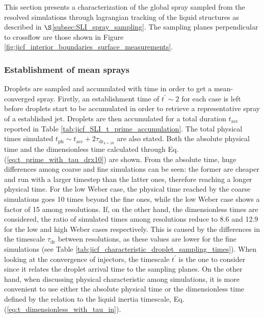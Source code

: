 
This section presents a characterization of the global spray sampled from the resolved simulations through lagrangian tracking of the liquid structures as described in $\S$\ref{subsec:SLI_spray_sampling}. The sampling planes perpendicular to crossflow are those shown in Figure \ref{fig:jicf_interior_boundaries_surface_measurements}.


\subsubsection*{Establishment of mean sprays}

Droplets are sampled and accumulated with time in order to get a mean-converged spray. Firstly, an establishment time of $t^{\prime} \sim 2$ for each case is left before droplets start to be accumulated in order to retrieve a representative spray of a established jet. Droplets are then accumulated for a total duration $t_\mathrm{acc}$ reported in Table \ref{tab:jicf_SLI_t_prime_accumulation}. The total physical times simulated $t_\mathrm{ph} \sim t_\mathrm{acc} + 2 \tau_\mathrm{dr_{x=10}}$ are also stated. Both the absolute physical time and the dimensionless time calculated through Eq. (\ref{eq:t_prime_with_tau_drx10}) are shown. From the absolute time, huge differences among coarse and fine simulations can be seen: the former are cheaper and run with a larger timestep than the latter ones, therefore reaching a longer physical time. For the low Weber case, the physical time reached by the coarse simulations goes 10 times beyond the fine ones, while the low Weber case shows a factor of 15 among resolutions. If, on the other hand, the dimensionless times are considered, the ratio of simulated times among resolutions reduce to 8.6 and 12.9 for the low and high Weber cases respectively. This is caused by the differences in the timescale $\tau_\mathrm{dr}$ between resolutions, as these values are lower for the fine simulations (see Table \ref{tab:jicf_characteristic_droplet_sampling_times}). When looking at the convergence of injectors, the timescale $t^{\prime}$ is the one to consider since it relates the droplet arrival time to the sampling planes. On the other hand, when discussing physical characteristic among simulations, it is more convenient to use either the absolute physical time or the dimensionless time defined by the relation to the liquid inertia timescale, Eq. (\ref{eq:t_dimensionless_with_tau_in}).



